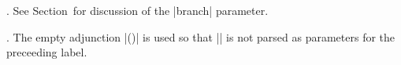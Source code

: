 . See Section~\gettag[CustomSec] for discussion of the
|branch| parameter.

. The empty adjunction |()| is used so that |\broken| is not
parsed as parameters for the preceeding label.

\endinput




\bigskip
An alternate to using |\stub| to position the crossing points is
|\psinterpolate|.

\medskip
\codelines
|\jtree[xunit=2.4em,yunit=1.2em,arrows=->,nodesep=0,
   arrowlength=3.6,arrowsize=2pt,arrowinset=.4]
\def\broken{[branch=\brokenbranch,scaleby=1.6]}%
\def\\#1{\rput[bl](.6ex,.4ex){\it #1}}%
\! = {\omit\\a}@A1
   <right>{\omit\\b}@A1a
   :{C$_2$}()  \broken @A2
   <right>@A3
   <right>@A3a
   :{C$_1$}()  \broken
   :{ubil}  {\omit\\c}@A4
   :{kolko}  {\omit\\d}
   :{studenti}  {\omit\\e}@A5
   :{ot} :{koi} {strani}.
\psinterpolate(A1)(A1a){.5}{K1}
\psinterpolate(A2)(A3){.5}{K2}
\psinterpolate(A3)(A3a){.5}{K3}
|endcodelines
\smallskip
\dots\ continues as above


